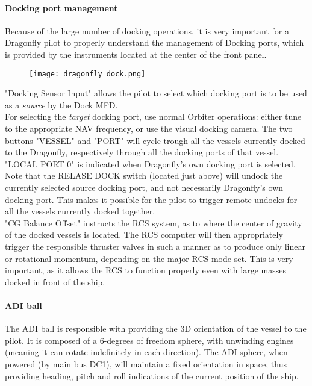 \documentclass[Orbiter User Manual.tex]{subfiles}
\begin{document}
\paragraph{Docking port management}
Because of the large number of docking operations, it is very important for a Dragonfly pilot to properly understand the management of Docking ports, which is provided by the instruments located at the center of the front panel.

\begin{figure}[H]
  \centering
  \texttt{[image: dragonfly\_dock.png]}
\end{figure}

\noindent
"Docking Sensor Input" allows the pilot to select which docking port is to be used as a \textit{source} by the Dock MFD.\\
For selecting the \textit{target} docking port, use normal Orbiter operations: either tune to the appropriate NAV frequency, or use the visual docking camera. The two buttons "VESSEL" and "PORT" will cycle trough all the vessels currently docked to the Dragonfly, respectively through all the docking ports of that vessel. "LOCAL PORT 0" is indicated when Dragonfly's own docking port is selected. Note that the RELASE DOCK switch (located just above) will undock the currently selected source docking port, and not necessarily Dragonfly's own docking port. This makes it possible for the pilot to trigger remote undocks for all the vessels currently docked together.\\
"CG Balance Offset" instructs the RCS system, as to where the center of gravity of the docked vessels is located. The RCS computer will then appropriately trigger the responsible thruster valves in such a manner as to produce only linear or rotational momentum, depending on the major RCS mode set. This is very important, as it allows the RCS to function properly even with large masses docked in front of the ship.

\paragraph{ADI ball}
The ADI ball is responsible with providing the 3D orientation of the vessel to the pilot. It is composed of a 6-degrees of freedom sphere, with unwinding engines (meaning it can rotate indefinitely in each direction). The ADI sphere, when powered (by main bus DC1), will maintain a fixed orientation in space, thus providing heading, pitch and roll indications of the current position of the ship.
\end{document}
